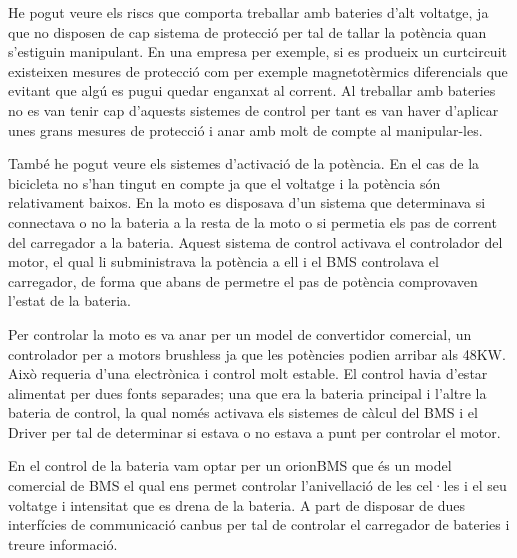 He pogut veure els riscs que comporta treballar amb bateries d'alt voltatge, ja que no disposen de cap sistema de protecció per tal de tallar la potència quan s'estiguin manipulant. En una empresa per exemple, si es produeix un curtcircuit existeixen mesures de protecció com per exemple magnetotèrmics diferencials que evitant que algú es pugui quedar enganxat al corrent. Al treballar amb bateries no es van tenir cap d'aquests sistemes de control per tant es van haver d'aplicar unes grans mesures de protecció i anar amb molt de compte al manipular-les. 

També he pogut veure els sistemes d'activació de la potència. En el cas de la bicicleta no s'han tingut en compte ja que el voltatge i la potència són relativament baixos. En la moto es disposava d'un sistema que determinava si connectava o no la bateria a la resta de la moto o si permetia els pas de corrent del carregador a la bateria. Aquest sistema de control activava el controlador del motor, el qual li subministrava la potència a ell i el BMS controlava el carregador, de forma que abans de permetre el pas de potència comprovaven l'estat de la bateria.

Per controlar la moto es va anar per un model de convertidor comercial, un controlador per a motors brushless ja que les potències podien arribar als 48KW. Això requeria d'una electrònica i control molt estable. El control havia d'estar alimentat per dues fonts separades; una que era la bateria principal i l'altre la bateria de control, la qual només activava els sistemes de càlcul del BMS i el Driver per tal de determinar si estava o no estava a punt per controlar el motor.

En el control de la bateria vam optar per un orionBMS que és un model comercial de BMS el qual ens permet controlar l'anivellació de les cel·les i el seu voltatge i intensitat que es drena de la bateria. A part de disposar de dues interfícies de communicació canbus per tal de controlar el carregador de bateries i treure informació.

